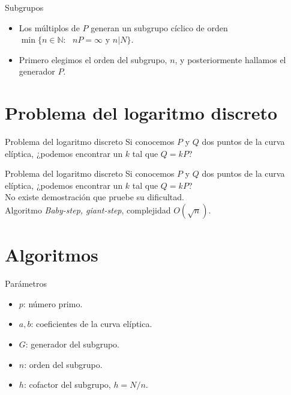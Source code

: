 \documentclass[12pt]{beamer}
\begin{document}
\begin{frame}[fragile]{Subgrupos}
  \begin{itemize}
  \item Los múltiplos de $P$ generan un subgrupo cíclico de orden $\min\{ n \in \mathbb{N}:\text{ } nP = \infty \text{ y } n | N\}$.
  \item Primero elegimos el orden del subgrupo, $n$, y posteriormente hallamos el generador $P$.
  \end{itemize}
  
\end{frame}

\section{Problema del logaritmo discreto}\label{dis_log}
\begin{frame}[fragile]{Problema del logaritmo discreto}
Si conocemos $ P $ y $ Q $ dos puntos de la curva elíptica, ¿podemos encontrar un $ k $ tal que $ Q = kP $?  
\end{frame}
\begin{frame}[fragile]{Problema del logaritmo discreto}
  Si conocemos $ P $ y $ Q $ dos puntos de la curva elíptica, ¿podemos encontrar un $ k $ tal que $ Q = kP $?\\
\vspace{3mm}
  No existe demostración que pruebe su dificultad.\\
\vspace{3mm}
  Algoritmo \textit{Baby-step, giant-step}, complejidad $O(\sqrt{n})$.\\
\end{frame}

\section*{Algoritmos}
\begin{frame}[fragile]{Parámetros}
  \begin{itemize}
	\item $ p $: número primo.
	\item $ a, b $: coeficientes de la curva elíptica.
	\item $ G $: generador del subgrupo.
	\item $ n $: orden del subgrupo.
	\item $ h $:  cofactor del subgrupo, $h = N / n$.
\end{itemize}
\end{frame}
\end{document}
